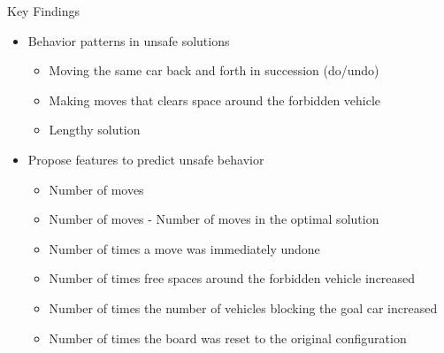 \begin{frame}{Key Findings}
\begin{itemize}
\item Behavior patterns in unsafe solutions
\begin{itemize}
\item Moving the same car back and forth in succession (do/undo)
\item Making moves that clears space around the forbidden vehicle
\item Lengthy solution
\end{itemize}
\item Propose features to predict unsafe behavior
\begin{itemize}
\item Number of moves
\item Number of moves - Number of moves in the optimal solution
\item Number of times a move was immediately undone
\item Number of times free spaces around the forbidden vehicle increased
\item Number of times the number of vehicles blocking the goal car increased
\item Number of times the board was reset to the original configuration
\end{itemize}
\end{itemize}
\end{frame}